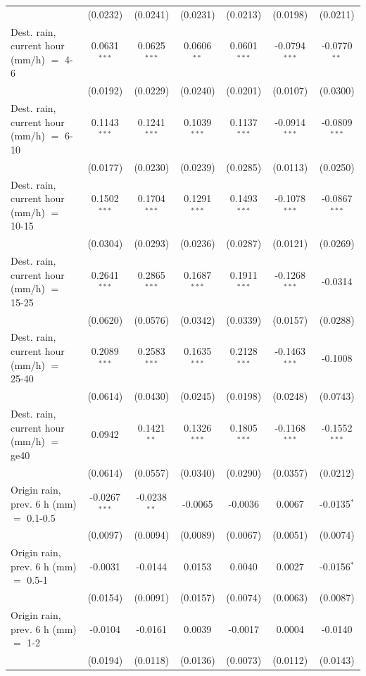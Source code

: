 \begin{tabular}{lcccccc}
    & (0.0232) & (0.0241) & (0.0231) & (0.0213) & (0.0198) & (0.0211)\\
   Dest. rain, current hour (mm/h) $=$ 4-6 & 0.0631$^{***}$ & 0.0625$^{***}$ & 0.0606$^{**}$ & 0.0601$^{***}$ & -0.0794$^{***}$ & -0.0770$^{**}$\\
    & (0.0192) & (0.0229) & (0.0240) & (0.0201) & (0.0107) & (0.0300)\\
   Dest. rain, current hour (mm/h) $=$ 6-10 & 0.1143$^{***}$ & 0.1241$^{***}$ & 0.1039$^{***}$ & 0.1137$^{***}$ & -0.0914$^{***}$ & -0.0809$^{***}$\\
    & (0.0177) & (0.0230) & (0.0239) & (0.0285) & (0.0113) & (0.0250)\\
   Dest. rain, current hour (mm/h) $=$ 10-15 & 0.1502$^{***}$ & 0.1704$^{***}$ & 0.1291$^{***}$ & 0.1493$^{***}$ & -0.1078$^{***}$ & -0.0867$^{***}$\\
    & (0.0304) & (0.0293) & (0.0236) & (0.0287) & (0.0121) & (0.0269)\\
   Dest. rain, current hour (mm/h) $=$ 15-25 & 0.2641$^{***}$ & 0.2865$^{***}$ & 0.1687$^{***}$ & 0.1911$^{***}$ & -0.1268$^{***}$ & -0.0314\\
    & (0.0620) & (0.0576) & (0.0342) & (0.0339) & (0.0157) & (0.0288)\\
   Dest. rain, current hour (mm/h) $=$ 25-40 & 0.2089$^{***}$ & 0.2583$^{***}$ & 0.1635$^{***}$ & 0.2128$^{***}$ & -0.1463$^{***}$ & -0.1008\\
    & (0.0614) & (0.0430) & (0.0245) & (0.0198) & (0.0248) & (0.0743)\\
   Dest. rain, current hour (mm/h) $=$ ge40 & 0.0942 & 0.1421$^{**}$ & 0.1326$^{***}$ & 0.1805$^{***}$ & -0.1168$^{***}$ & -0.1552$^{***}$\\
    & (0.0614) & (0.0557) & (0.0340) & (0.0290) & (0.0357) & (0.0212)\\
   Origin rain, prev. 6 h (mm) $=$ 0.1-0.5 & -0.0267$^{***}$ & -0.0238$^{**}$ & -0.0065 & -0.0036 & 0.0067 & -0.0135$^{*}$\\
    & (0.0097) & (0.0094) & (0.0089) & (0.0067) & (0.0051) & (0.0074)\\
   Origin rain, prev. 6 h (mm) $=$ 0.5-1 & -0.0031 & -0.0144 & 0.0153 & 0.0040 & 0.0027 & -0.0156$^{*}$\\
    & (0.0154) & (0.0091) & (0.0157) & (0.0074) & (0.0063) & (0.0087)\\
   Origin rain, prev. 6 h (mm) $=$ 1-2 & -0.0104 & -0.0161 & 0.0039 & -0.0017 & 0.0004 & -0.0140\\
    & (0.0194) & (0.0118) & (0.0136) & (0.0073) & (0.0112) & (0.0143)\\

\end{tabular}
